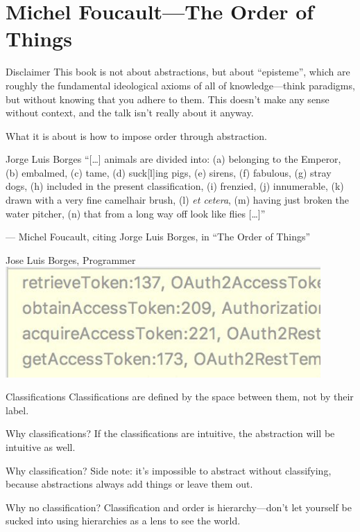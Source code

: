 \documentclass[aspectratio=169]{beamer}
\begin{document}
  \section{Michel Foucault—The Order of Things}
  \begin{frame}{Disclaimer}
    This book is not about abstractions, but about “episteme”, which are roughly
    the fundamental ideological axioms of all of knowledge—think paradigms, but
    without knowing that you adhere to them. This doesn’t make any sense
    without context, and the talk isn’t really about it anyway.

    What it is about is how to impose order through abstraction.
  \end{frame}
  \begin{frame}{Jorge Luis Borges}
    “[\ldots] animals are divided into: (a) belonging to the Emperor, (b)
    embalmed, (c) tame, (d) suck[l]ing pigs, (e) sirens, (f) fabulous, (g) stray
    dogs, (h) included in the present classification, (i) frenzied, (j)
    innumerable, (k) drawn with a very fine camelhair brush, (l) \textit{et
    cetera}, (m) having just broken the water pitcher, (n) that from a long
    way off look like flies [\ldots]”

    — Michel Foucault, citing Jorge Luis Borges, in “The Order of Things”
  \end{frame}
  \begin{frame}{Jose Luis Borges, Programmer}
    \includegraphics[width=12cm]{traceback}
  \end{frame}
  \begin{frame}{Classifications}
    Classifications are defined by the space between them, not by their label.
  \end{frame}
  \begin{frame}{Why classifications?}
    If the classifications are intuitive, the abstraction will be intuitive as
    well.
  \end{frame}
  \begin{frame}{Why classification?}
    Side note: it’s impossible to abstract without classifying, because
    abstractions always add things or leave them out.
  \end{frame}
  \begin{frame}{Why no classification?}
    Classification and order is hierarchy—don’t let yourself be sucked into
    using hierarchies as a lens to see the world.
  \end{frame}
\end{document}
